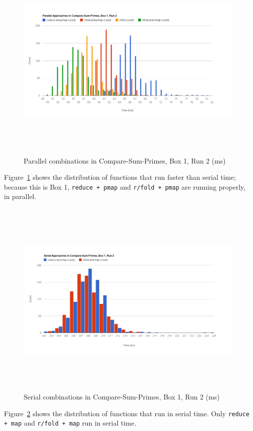 \documentclass[12pt]{article}
\newcommand{\clocode}[1]{{\texttt {#1}}}
\begin{document}
\begin{figure}[h!]
\includegraphics[trim = 10mm 10mm 30mm 30mm, clip, width = 16cm,height = 10cm]{PSP-B1}
\caption{Parallel combinations in Compare-Sum-Primes, Box 1, Run 2 (ms)}\label{figure:parallel}
\end{figure}
 Figure~\ref{figure:parallel} shows the distribution of functions that run faster than serial time; because this is Box 1, \clocode{reduce + pmap} and \clocode{r/fold + pmap} are running properly, in parallel.
\begin{figure}[h!]
\includegraphics[trim = 10mm 10mm 10mm 30mm, clip, width = 16cm,height = 9.75cm]{SSP-B1}
\caption{Serial combinations in Compare-Sum-Primes, Box 1, Run 2 (ms)}\label{figure:serial}
\end{figure}
Figure~\ref{figure:serial} shows the distribution of functions that run in serial time. Only \clocode{reduce + map} and \clocode{r/fold + map} run in serial time.
\end{document}
